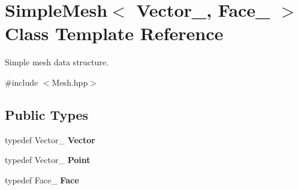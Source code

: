 \hypertarget{class_d_o_1_1_simple_mesh}{\section{Simple\-Mesh$<$ Vector\-\_\-, Face\-\_\- $>$ Class Template Reference}
\label{class_d_o_1_1_simple_mesh}
}


Simple mesh data structure.  




{\ttfamily \#include $<$Mesh.\-hpp$>$}

\subsection*{Public Types}
\begin{DoxyCompactItemize}
\item 
\hypertarget{class_d_o_1_1_simple_mesh_a4e0f748b614e44317e0961073fec8585}{typedef Vector\-\_\- {\bfseries Vector}}\label{class_d_o_1_1_simple_mesh_a4e0f748b614e44317e0961073fec8585}

\item 
\hypertarget{class_d_o_1_1_simple_mesh_aea0be5a8a64c17740c31d27605b844e1}{typedef Vector\-\_\- {\bfseries Point}}\label{class_d_o_1_1_simple_mesh_aea0be5a8a64c17740c31d27605b844e1}

\item 
\hypertarget{class_d_o_1_1_simple_mesh_aae4240566b5bfdaa1405339dd3831082}{typedef Face\-\_\- {\bfseries Face}}\label{class_d_o_1_1_simple_mesh_aae4240566b5bfdaa1405339dd3831082}

\end{DoxyCompactItemize}
